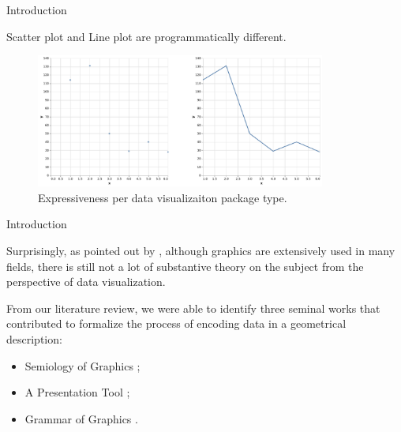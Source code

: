 \documentclass[aspectratio=169,xcolor=dvipsnames,9pt]{beamer}
\begin{document}
\begin{frame}[fragile]{Introduction}

	Scatter plot and Line plot are programmatically different.
	\begin{figure}
		\begin{center}
			\includegraphics[width=0.85\textwidth]{./figures/scatterplot lineplot.pdf}
		\end{center}
		\caption{Expressiveness per data visualizaiton package type.}
		\label{fig:expressiveness}
	\end{figure}

\end{frame}

\begin{frame}[fragile]{Introduction}

	Surprisingly, as pointed out by \citet{chen2007handbook},
	although graphics are extensively used in
	many fields, there is still not a lot of substantive theory on the subject
	from the perspective of data visualization.
	\vspace{5mm}

	From our literature review, we were able to identify three
	seminal works that contributed to formalize the process of encoding
	data in a geometrical description:
	\begin{itemize}
		\item  Semiology of Graphics \citep{bertin1983semiology};
		\item  A Presentation Tool \citep{mackinlay1986automating};
		\item  Grammar of Graphics \citep{wilkinson2012grammar}.
	\end{itemize}

\end{frame}
\end{document}
